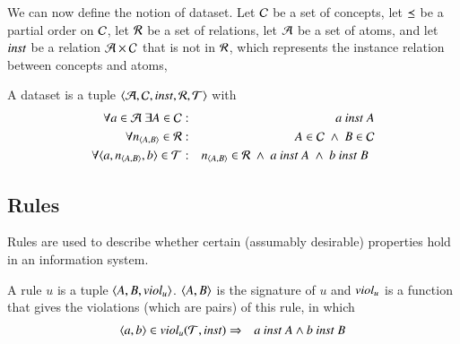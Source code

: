\documentclass{elsarticle}
\begin{document}
   We can now define the notion of dataset.
   Let $\mathcal{C}$ be a set of concepts,
   let $\preceq$ be a partial order on $\mathcal{C}$,
   let $\mathcal{R}$ be a set of relations,
   let $\mathcal{A}$ be a set of atoms,
   and let $\text{\it inst\/}$ be a relation $\mathcal{A}\times\mathcal{C}$ that is not in $\mathcal{R}$, which represents the instance relation between concepts and atoms,
\begin{definition}[dataset]
   \label{def:dataset}
   \item A dataset is a tuple $\langle\mathcal{A},\mathcal{C},\text{\it inst\/},\mathcal{R},\mathcal{T}\rangle$ with
   \begin{eqnarray}
      \forall a\in\atoms\ \exists A\in\concepts&:&a\ \inst\ A\\
      \forall \declare{n}{A}{B}\in\rels&:&A\in\concepts\ \wedge\ B\in\concepts\\
      \forall\triple{a}{\declare{n}{A}{B}}{b}\in\triples&:&\begin{array}[t]{@{}l}\declare{n}{A}{B}\in\rels\ \wedge\ a\ \inst\ A\ \wedge\ b\ \inst\ B\end{array}
   \end{eqnarray}
\end{definition}

\subsection{Rules}
\label{sct:Rules}
   Rules are used to describe whether certain (assumably desirable) properties hold in an information system.

\begin{definition}[rule]
   \label{def:rule}
   \item A rule $u$ is a tuple $\langle A,B,\text{\it viol\/}_u\rangle$.
   $\langle{A},{B}\rangle$ is the signature of $u$ and
   $\text{\it viol\/}_u$ is a function that gives the violations (which are pairs) of this rule,
   in which
\begin{eqnarray}
   \langle{a},{b}\rangle\in\text{\it viol\/}_{u}(\mathcal{T},\text{\it inst\/})&\Rightarrow&a\ \text{\it inst\/}\ A\wedge b\ \text{\it inst\/}\ B
\end{eqnarray}
\end{definition}
\end{document}
